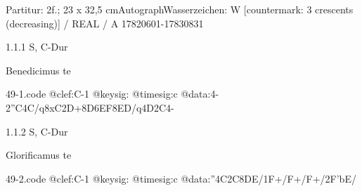 \documentclass[a4paper, twocolumn, 11pt]{book}
\begin{document}
\par \textcolor{darkblue}{}  Partitur: 2f.; 23 x 32,5 cm\newline Autograph\newline Wasserzeichen: W [countermark: 3 crescents (decreasing)] / REAL / A  17820601-17830831
\par 1.1.1  S, C-Dur\newline \begin{footnotesize} Benedicimus te \end{footnotesize}  
\begin{filecontents*}{49-1.code}
@clef:C-1
@keysig:
@timesig:c
@data:4-2''C4C/q8xC2D+{8D6EF}8ED/q4D2C4-
\end{filecontents*}

\newline %
\par 1.1.2  S, C-Dur\newline \begin{footnotesize} Glorificamus te \end{footnotesize}  
\begin{filecontents*}{49-2.code}
@clef:C-1
@keysig:
@timesig:c
@data:''4C2C{8DE}/1F+/F+/F+/2F'bE/
\end{filecontents*}
\end{document}
